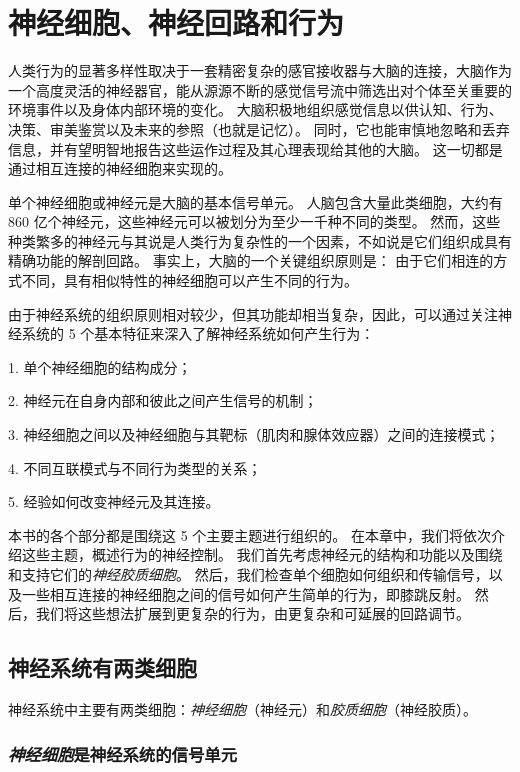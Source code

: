\chapter{神经细胞、神经回路和行为} \label{chap:chap3}



人类行为的显著多样性取决于一套精密复杂的感官接收器与大脑的连接，大脑作为一个高度灵活的神经器官，能从源源不断的感觉信号流中筛选出对个体至关重要的环境事件以及身体内部环境的变化。
大脑积极地组织感觉信息以供认知、行为、决策、审美鉴赏以及未来的参照（也就是记忆）。
同时，它也能审慎地忽略和丢弃信息，并有望明智地报告这些运作过程及其心理表现给其他的大脑。
这一切都是通过相互连接的神经细胞来实现的。


单个神经细胞或神经元是大脑的基本信号单元。 
人脑包含大量此类细胞，大约有 860 亿个神经元，这些神经元可以被划分为至少一千种不同的类型。 
然而，这些种类繁多的神经元与其说是人类行为复杂性的一个因素，不如说是它们组织成具有精确功能的解剖回路。 
事实上，大脑的一个关键组织原则是：
由于它们相连的方式不同，具有相似特性的神经细胞可以产生不同的行为。


由于神经系统的组织原则相对较少，但其功能却相当复杂，因此，可以通过关注神经系统的 5 个基本特征来深入了解神经系统如何产生行为：

1. 单个神经细胞的结构成分；

2. 神经元在自身内部和彼此之间产生信号的机制；

3. 神经细胞之间以及神经细胞与其靶标（肌肉和腺体效应器）之间的连接模式；

4. 不同互联模式与不同行为类型的关系；

5. 经验如何改变神经元及其连接。


本书的各个部分都是围绕这 5 个主要主题进行组织的。
在本章中，我们将依次介绍这些主题，概述行为的神经控制。
我们首先考虑神经元的结构和功能以及围绕和支持它们的\textit{神经胶质细胞}。
然后，我们检查单个细胞如何组织和传输信号，以及一些相互连接的神经细胞之间的信号如何产生简单的行为，即膝跳反射。
然后，我们将这些想法扩展到更复杂的行为，由更复杂和可延展的回路调节。



\section{神经系统有两类细胞}

神经系统中主要有两类细胞：\textit{神经细胞}（神经元）和\textit{胶质细胞}（神经胶质）。


\subsection{\textit{神经细胞}是神经系统的信号单元}

